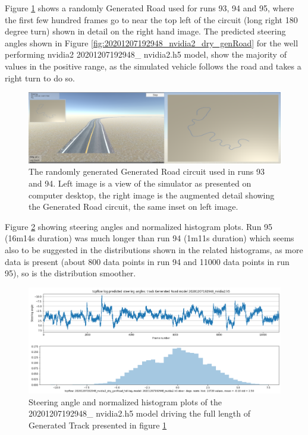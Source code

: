 Figure \ref{fig:run-93-94-generated-road} shows a randomly Generated Road used for runs 93, 94 and 95, where the first few hundred frames go to near the top left of the circuit (long right 180 degree turn) shown in detail on the right hand image. The predicted steering angles shown in Figure  \ref{fig:20201207192948_nvidia2_dry_genRoad} for the well performing nvidia2 20201207192948\_ nvidia2.h5 model, show the majority of values in the positive range, as the simulated vehicle follows the road and takes a right turn to do so.

\begin{figure}[ht]
 \centering 
 \includegraphics[width=\textwidth]{Figures/run-93-94-generated-road.png}
 \caption{The randomly generated Generated Road circuit used in runs 93 and 94. Left image is a view of the simulator as presented on computer desktop, the right image is the augmented detail showing the Generated Road circuit, the same inset on left image.}
 \label{fig:run-93-94-generated-road} 
\end{figure}

Figure \ref{fig:20201207192948_nvidia2_dry_genRoad_full} showing steering angles and normalized histogram plots. Run 95 (16m14s duration) was much longer than run 94 (1m11s duration) which seems also to be suggested in the distributions shown in the related histograms, as more data is present (about 800 data points in run 94 and 11000 data points in run 95), so is the distribution smoother.
\begin{figure}[ht]
 \centering 
 \includegraphics[width=\textwidth]{Figures/20201207192948_nvidia2_dry_genRoad_full.png}
 \caption{Steering angle and normalized histogram plots of the 20201207192948\_ nvidia2.h5 model driving the full length of Generated Track presented in figure \ref{fig:run-93-94-generated-road} }
 \label{fig:20201207192948_nvidia2_dry_genRoad_full} 
\end{figure}

